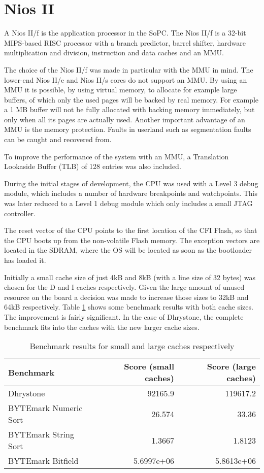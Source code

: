 \newpage
\section{Nios II}
A Nios II/f is the application processor in the SoPC. The Nios II/f is a 32-bit MIPS-based
RISC processor with a branch predictor, barrel shifter, hardware multiplication and division,
instruction and data caches and an MMU.

The choice of the Nios II/f was made in particular with the MMU in mind. The lower-end Nios II/e and
Nios II/s cores do not support an MMU. By using an MMU it is possible, by using virtual memory,
to allocate for example large buffers, of which only the used pages will be backed by real memory. For example
a 1 MB buffer will not be fully allocated with backing memory immediately, but only when all its pages are
actually used. Another important advantage of an MMU is the memory protection. Faults in userland such as
segmentation faults can be caught and recovered from.

To improve the performance of the system with an MMU, a Translation Lookaside Buffer (TLB) of 128 entries was
also included.

During the initial stages of development, the CPU was used with a Level 3 debug module, which includes a number
of hardware breakpoints and watchpoints. This was later reduced to a Level 1 debug module which only includes
a small JTAG controller.

The reset vector of the CPU points to the first location of the CFI Flash, so that the CPU boots up from
the non-volatile Flash memory. The exception vectors are located in the SDRAM, where the OS will be located
as soon as the bootloader has loaded it.

Initially a small cache size of just 4kB and 8kB (with a line size of 32 bytes) was chosen for
the D and I caches respectively. Given the large amount of unused resource on the board a decision
was made to increase those sizes to 32kB and 64kB respectively. Table \ref{table:benchmark} shows some benchmark results
with both cache sizes. The improvement is fairly significant. In the case of Dhrystone, the complete
benchmark fits into the caches with the new larger cache sizes.


\begin{table}[h!]
\centering
\begin{tabular}{ | l | r | r | }
 \hline
   Benchmark           & Score (small caches) & Score (large caches)\\
 \hline
   Dhrystone & 92165.9 & 119617.2 \\
 \hline
   BYTEmark Numeric Sort & 26.574 & 33.36 \\
 \hline
   BYTEmark String Sort & 1.3667 & 1.8123 \\
 \hline
   BYTEmark Bitfield & 5.6997e+06 & 5.8613e+06 \\
 \hline
\end{tabular}
\caption{Benchmark results for small and large caches respectively}
\label{table:benchmark}
\end{table}



